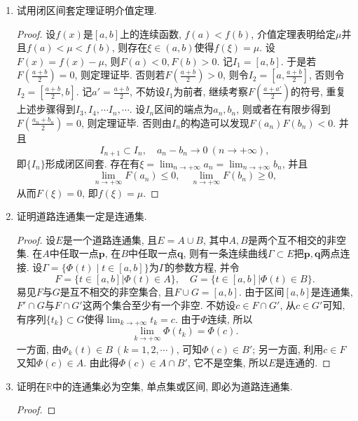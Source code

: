 \begin{3a}
\begin{enumerate}
\begin{proof}
\end{proof}
\item 试用闭区间套定理证明介值定理.
\begin{proof}
设\(f(x)\)是\([a,b]\)上的连续函数, \(f(a)<f(b)\), 介值定理表明给定\(\mu\)并且\(f(a)<\mu<f(b)\), 则存在\(\xi\in(a,b)\)使得\(f(\xi)=\mu\). 
设\(F(x)=f(x)-\mu\), 则\(F(a)<0, F(b)>0\). 记\(I_1=[a,b]\). 于是若\(F\left(\frac{a+b}{2}\right)=0\), 则定理证毕. 
否则若\(F\left(\frac{a+b}{2}\right)>0\), 则令\(I_2=\left[a,\frac{a+b}{2}\right]\), 否则令\(I_2=\left[\frac{a+b}{2},b\right]\). 
记\(a'=\frac{a+b}{2}\), 不妨设\(I_1\)为前者, 继续考察\(F\left(\frac{a+a'}{2}\right)\)的符号, 重复上述步骤得到\(I_3,I_4,\cdots I_n,\cdots\). 
设\(I_n\)区间的端点为\(a_n,b_n\), 则或者在有限步得到\(F\left(\frac{a_n+b_n}{2}\right)=0\), 则定理证毕.
否则由\(I_n\)的构造可以发现\(F(a_n)F(b_n)<0\). 并且
\[I_{n+1}\subset I_{n},\quad a_n-b_n\rightarrow 0\ (n\rightarrow+\infty),\]
即\(\{I_n\}\)形成闭区间套. 存在有\(\xi=\lim_{n\rightarrow+\infty}a_n=\lim_{n\rightarrow+\infty}b_n\), 并且
\[\lim_{n\rightarrow+\infty}F(a_n)\leqslant 0,\quad\lim_{n\rightarrow+\infty}F(b_n)\geqslant 0,\]从而\(F(\xi)=0\), 即\(f(\xi)=\mu.\)
\end{proof}
\item 证明道路连通集一定是连通集.
\begin{proof}
设\(E\)是一个道路连通集, 且\(E=A\cup B\), 其中\(A,B\)是两个互不相交的非空集. 
在\(A\)中任取一点\(\boldsymbol{p}\), 在\(B\)中任取一点\(\boldsymbol{q}\), 
则有一条连续曲线\(\varGamma\subset E\)把\(\boldsymbol{p},\boldsymbol{q}\)两点连接. 
设\(\varGamma=\{\varPhi(t) \mid t\in[a,b]\}\)为\(\varGamma\)的参数方程, 并令
\[F=\{t\in[a,b]\big|\boldsymbol{\varPhi}(t)\in A\},\quad G=\{t\in[a,b]\big|\boldsymbol{\varPhi}(t)\in B\}.\]
易见\(F\)与\(G\)是互不相交的非空集合, 且\(F\cup G=[a,b]\). 
由于区间\([a,b]\)是连通集, \(F'\cap G\)与\(F\cap G'\)这两个集合至少有一个非空. 
不妨设\(c\in F\cap G'\), 从\(c\in G'\)可知, 
有序列\(\{t_k\}\subset G\)使得\(\lim_{k\rightarrow+\infty}t_k=c\). 
由于\(\varPhi\)连续, 所以
\[\lim_{k\rightarrow+\infty}\varPhi(t_k)=\varPhi(c).\]
一方面, 由\(\varPhi_k(t)\in B\ (k=1,2,\cdots)\), 
可知\(\varPhi(c)\in B'\); 
另一方面, 利用\(c\in F\)又知\(\varPhi(c)\in A\). 
由此得\(\varPhi(c)\in A\cap B'\), 它不是空集, 所以\(E\)是连通的.
\end{proof}
\item 证明在\(\mathbb{R}\)中的连通集必为空集, 单点集或区间, 即必为道路连通集.
\begin{proof}


\end{proof}
\end{enumerate}
\end{3a}
